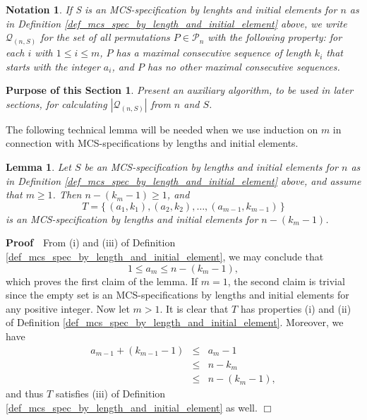 \documentclass{article}
\newtheorem{lemma}[theorem]{Lemma}
\newtheorem{notation}[theorem]{Notation}
\newtheorem{purpose}{Purpose of this Section}
\def\proof{\par \noindent              %
\mbox{\bf Proof}\ \,}                  %
\def\endproof{\mbox{$\Box$} \par }     %
\begin{document}
\begin{notation}\label{notation_mcs_spec_by_length_and_initial_element}
  If S is an MCS-specification by lenghts and initial elements for $n$ as in
  Definition \ref{def_mcs_spec_by_length_and_initial_element}
  above, we write ${\mathcal Q}_{(n,S)}$ for the set of all permutations
  $P \in {\mathcal P}_n$ with the following property: for each $i$ with $1\leq i \leq m$, $P$ has a maximal
  consecutive sequence of length $k_i$ that starts with the integer $a_i$, and $P$ has no other maximal
  consecutive sequences.
\end{notation}

\begin{purpose}
Present an auxiliary algorithm, to be used in later sections,
for calculating $|{\mathcal Q}_{(n,S)}|$ from $n$ and $S$.
\end{purpose}

The following technical lemma will be needed when we use induction on $m$ in connection with
MCS-specifications by lengths and initial elements.

\begin{lemma}\label{lemma_ind_on_m} 
  Let $S$ be an MCS-specification by lengths and initial elements for $n$ as in
  Definition \ref{def_mcs_spec_by_length_and_initial_element}
  above, and assume that $m\geq 1$. Then $n-(k_m-1) \geq 1$, and
  $$T = \{\,(a_1, k_1), (a_2, k_2), \ldots,(a_{m-1}, k_{m-1})\,\}$$
  is an MCS-specification by lengths and initial elements for $n-(k_m-1)$.
\end{lemma}

\proof
From (i) and (iii) of Definition \ref{def_mcs_spec_by_length_and_initial_element}, we may conclude that
$$1 \leq a_m \leq n - (k_m - 1),$$ which proves the first claim of the lemma.
If $m=1$, the second claim is trivial since the empty set is an MCS-specifications by lengths
and initial elements for any positive integer. Now let $m > 1$. It is clear that $T$ has properties
(i) and (ii) of Definition \ref{def_mcs_spec_by_length_and_initial_element}. Moreover, we have 
\begin{eqnarray*}
  a_{m-1} + (k_{m-1} - 1) & \leq & a_m - 1 \\
                          & \leq & n - k_m \\
                          & \leq & n - (k_m-1),
\end{eqnarray*} 
and thus $T$ satisfies (iii) of Definition \ref{def_mcs_spec_by_length_and_initial_element} as well.
\endproof
\end{document}
